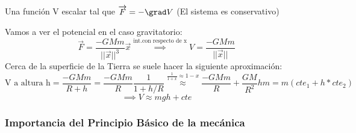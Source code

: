 \begin{defn}
	Una función V escalar tal que $\overrightarrow F = -\grad V$ (El sistema es conservativo)
\end{defn}

\begin{example}
	Vamos a ver el potencial en el caso gravitatorio:
	$$\overrightarrow F = \frac{-GMm}{||\overrightarrow x||^3}\overrightarrow x \stackrel{\text{int.con respecto de x}}{\implies} V = \frac{-GMm}{||\overrightarrow x||}$$
	Cerca de la superficie de la Tierra se suele hacer la siguiente aproximación:
	$$\text{V a altura h} = \frac{-GMm}{R + h} = \frac{-GMm}{R} \frac{1}{1+ h/R} \stackrel{\frac{1}{1+x} \approx 1-x}{\approx} \frac{-GMm}{R} + \frac{GM}{R^2}hm = m(cte_1 + h*cte_2)$$$$\implies V\approx mgh + cte$$
\end{example}
\subsubsection{Importancia del Principio Básico de la mecánica}

